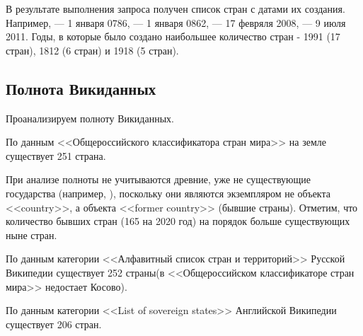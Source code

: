 
В результате выполнения запроса получен список стран с датами их создания. Например,  --- 1 января 0786,  --- 1 января 0862,  --- 17 февряля 2008,  --- 9 июля 2011. Годы, в которые было создано наибольшее количество стран - 1991 (17 стран), 1812 (6 стран) и 1918 (5 стран).


\subsection{Полнота Викиданных}

Проанализируем полноту Викиданных.

По данным <<Общероссийского классификатора стран мира>>\cite{country_1} на земле существует 251 страна.

При анализе полноты не учитываются древние, уже не существующие государства (например, ), поскольку они являются экземпляром не объекта <<country>>, а объекта <<former country>> (бывшие страны). Отметим, что количество бывших стран (165 на 2020 год) на порядок больше существующих ныне стран.

По данным категории <<Алфавитный список стран и территорий>>\cite{country_3} Русской Википедии существует 252 страны(в  <<Общероссийском классификаторе стран мира>> недостает Косово).

По данным категории <<List of sovereign states>>\cite{country_4} Английской Википедии существует 206 стран.

